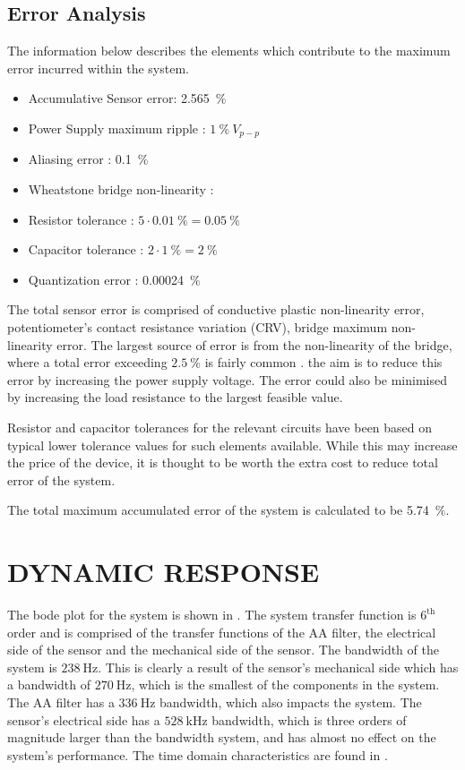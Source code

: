 \documentclass[10pt,twocolumn]{witseiepaper}
\begin{document}
\subsection{Error Analysis}

The information below describes the elements which contribute to the maximum error incurred within the system.

\begin{itemize}
	\item Accumulative Sensor error: 2.565~$\%$
	\item Power Supply maximum ripple : $1~\%~V_{p-p}$
	\item Aliasing error : 0.1~$\%$
	\item Wheatstone bridge non-linearity : 
	\item Resistor tolerance : $5\cdot0.01~\% = 0.05~\%$
	\item Capacitor tolerance : $2\cdot1~\% = 2~\%$
	\item Quantization error : 0.00024~$\%$
\end{itemize}

The total sensor error is comprised of conductive plastic non-linearity error, potentiometer's contact resistance variation (CRV), bridge maximum non-linearity error. The largest source of error is from the non-linearity of the bridge, where a total error exceeding $2.5~\%$ is fairly common \cite{nonlinearity}. the aim is to reduce this error by increasing the power supply voltage. The error could also be minimised by increasing the load resistance to the largest feasible value.

Resistor and capacitor tolerances for the relevant circuits have been based on typical lower tolerance values for such elements available. While this may increase the price of the device, it is thought to be worth the extra cost to reduce total error of the system.

The total maximum accumulated error of the system is calculated to be 5.74~$\%$. 

\section{DYNAMIC RESPONSE}

The bode plot for the system is shown in . The system transfer function is $\mathrm{6^{th}}$ order and is comprised of the transfer functions of the AA filter, the electrical side of the sensor and the mechanical side of the sensor. The bandwidth of the system is $238~\mathrm{Hz}$. This is clearly a result of the sensor's mechanical side which has a bandwidth of $270~\mathrm{Hz}$, which is the smallest of the components in the system. The AA filter has a $336~\mathrm{Hz}$ bandwidth, which also impacts the system. The sensor's electrical side has a $528~\mathrm{kHz}$ bandwidth, which is three orders of magnitude larger than the  bandwidth system, and has almost no effect on the system's performance. The time domain characteristics are found in .
\end{document}
